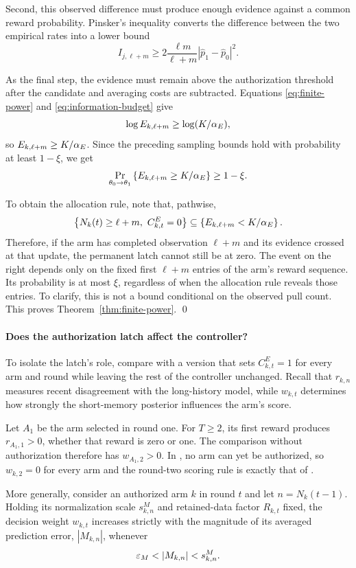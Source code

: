Second, this observed difference must produce enough evidence against a common
reward probability.
Pinsker's inequality converts the difference between the two empirical rates into a lower bound
\[
I_{j,\ell+m}
\geq
2\frac{\ell m}{\ell+m}
|\widehat p_1-\widehat p_0|^2.
\]

As the final step, the evidence must remain above the authorization threshold after the
candidate and averaging costs are subtracted.
Equations \eqref{eq:finite-power} and \eqref{eq:information-budget} give
\[
\log E_{k,\ell+m}\geq\log(K/\alpha_E),
\]
so $E_{k,\ell+m}\geq K/\alpha_E$.
Since the preceding sampling bounds hold with probability at least
$1-\xi$, we get
\[
\Pr_{\theta_0\to\theta_1}
\left\{
E_{k,\ell+m}\geq K/\alpha_E
\right\}
\geq1-\xi.
\]

To obtain the allocation rule, note that, pathwise,
\[
\left\{
N_k(t)\geq\ell+m,\ C^E_{k,t}=0
\right\}
\subseteq
\left\{
E_{k,\ell+m}<K/\alpha_E
\right\}.
\]
Therefore, if the arm has completed observation $\ell+m$ and its
evidence crossed at that update, the permanent latch cannot still
be at zero.
The event on the right depends only on the fixed first $\ell+m$
entries of the arm's reward sequence.
Its probability is at most $\xi$, regardless of when the allocation
rule reveals those entries.
To clarify, this is not a bound conditional on the observed pull count.
This proves Theorem~\ref{thm:finite-power}. \qed

\paragraph{Does the authorization latch affect the controller?}
To isolate the latch's role, compare \method{} with a version that sets
$C^E_{k,t}=1$ for every arm and round while leaving the rest of the controller
unchanged.
Recall that $r_{k,n}$ measures recent disagreement with the
long-history model, while $w_{k,t}$ determines how strongly the short-memory
posterior influences the arm's score.

\begin{proposition}
\label{prop:load-bearing}
Let $A_1$ be the arm selected in round one. For $T\geq2$, its first reward
produces $r_{A_1,1}>0$, whether that reward is zero or one. The comparison
without authorization therefore has $w_{A_1,2}>0$. In \method{}, no arm can
yet be authorized, so $w_{k,2}=0$ for every arm and the round-two scoring rule
is exactly that of \anchor{}.

More generally, consider an authorized arm $k$ in round $t$ and let
$n=N_k(t-1)$.
Holding its normalization scale $s^M_{k,n}$ and retained-data
factor $R_{k,t}$ fixed, the decision weight $w_{k,t}$ increases strictly with
the magnitude of its averaged prediction error, $|M_{k,n}|$, whenever
\[
\epsM<|M_{k,n}|<s^M_{k,n}.
\]
\end{proposition}

